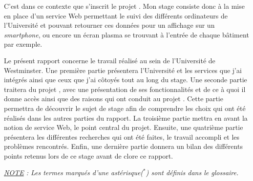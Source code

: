 C'est dans ce contexte que s'inscrit le projet \YuukouII. 
Mon stage consiste donc \`a la mise en place d'un service Web permettant le suivi des diff\'erents ordinateurs de l'Universit\'e et pouvant retourner ces donn\'ees pour un affichage sur un \textit{smartphone}, ou encore un \'ecran plasma se trouvant \`a l'entr\'ee de chaque b\^atiment par exemple.

Le pr\'esent rapport concerne le travail r\'ealis\'e au sein de l'Universit\'e de Westminster.
Une premi\`ere partie pr\'esentera l'Universit\'e et les services que j'ai int\'egr\'es ainsi que ceux que j'ai c\^otoy\'es tout au long du stage.
Une seconde partie traitera du projet \Yuukou{}, avec une pr\'esentation de ses fonctionnalit\'es et de ce \`a quoi il donne acc\`es  ainsi que des raisons qui ont conduit au projet \YuukouII.
Cette partie permettra de d\'ecouvrir le sujet de stage afin de comprendre les choix qui ont \'et\'e r\'ealis\'es dans les autres parties du rapport.
La troisi\`eme partie mettra en avant la notion de service Web, le point central du projet.
Ensuite, une quatri\`eme partie pr\'esentera les diff\'erentes recherches qui ont \'et\'e faites, le travail accompli et les probl\`emes rencontr\'es.
Enfin, une derni\`ere partie donnera un bilan des diff\'erents points retenus lors de ce stage avant de clore ce rapport.

\vspace{1.5cm}

\begin{center}
\textit{\underline{NOTE} : Les termes marqu\'es d'une ast\'erisque($^*$) sont d\'efinis dans le glossaire.}

\end{center}

\clearpage
